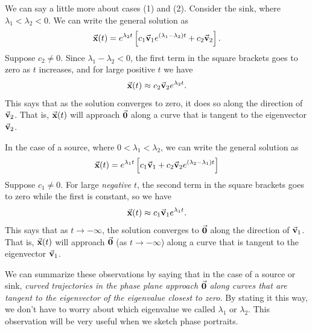We can say a little more about cases (1) and (2).
Consider the sink, where $\lambda_1 < \lambda_2 < 0$.
We can write the general solution as
\begin{equation}
\vec{\textbf{x}}(t) = e^{\lambda_2 t}\left[c_1\vec{\textbf{v}}_1 e^{(\lambda_1-\lambda_2)t} + c_2\vec{\textbf{v}}_2\right] . 
\end{equation} 
Suppose $c_2\ne 0$.
Since $\lambda_1-\lambda_2 < 0$, the first term in the
square brackets goes to zero as $t$ increases,
and for large positive $t$ we have
\begin{equation}
  \vec{\textbf{x}}(t) \approx c_2\vec{\textbf{v}}_2 e^{\lambda_2 t}.
\end{equation}
This says that as the solution converges to zero, it does
so along the direction of $\vec{\textbf{v}}_2$.
That is, $\vec{\textbf{x}}(t)$ will approach $\vec{\textbf{0}}$ along a curve that
is tangent to the eigenvector $\vec{\textbf{v}}_2$.

In the case of a source, where $0 < \lambda_1 < \lambda_2$,
we can write the general solution as
\begin{equation}
\vec{\textbf{x}}(t) = e^{\lambda_1 t}\left[c_1\vec{\textbf{v}}_1 + c_2\vec{\textbf{v}}_2 e^{(\lambda_2-\lambda_1)t}\right] 
\end{equation}
Suppose $c_1\ne 0$.
For large \emph{negative} $t$, the second term in the
square brackets goes to zero while the first is constant, so we have
\begin{equation}
 \vec{\textbf{x}}(t) \approx c_1 \vec{\textbf{v}}_1 e^{\lambda_1 t}.
\end{equation}
This says that
as $t\rightarrow-\infty$, the solution converges to
$\vec{\textbf{0}}$ along the direction of $\vec{\textbf{v}}_1$.  That is,
$\vec{\textbf{x}}(t)$ will approach $\vec{\textbf{0}}$ (as $t\rightarrow-\infty$)
along a curve that is tangent to the eigenvector
$\vec{\textbf{v}}_1$.

We can summarize these observations by saying
that in the case of a source or sink,
\emph{curved trajectories in the phase plane approach
$\vec{\textbf{0}}$ along curves that are tangent to the eigenvector
of the eigenvalue closest to zero.}
By stating it this way, we don't have to worry
about which eigenvalue we called $\lambda_1$ or
$\lambda_2$.  This observation will be very useful
when we sketch phase portraits.

